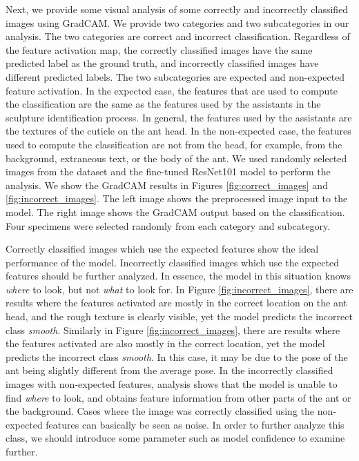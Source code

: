 \documentclass{aci}
\numberwithin{equation}{section}
\begin{document}

Next, we provide some visual analysis of some correctly and
incorrectly classified images using GradCAM. We provide two categories and two
subcategories in our analysis. The two categories are correct and incorrect
classification. Regardless of the feature activation map, the correctly
classified images have the same predicted label as the ground truth, and
incorrectly classified images have different predicted labels. The two
subcategories are expected and non-expected feature activation. In the expected
case, the features that are used to compute the classification are the same as
the features used by the assistants in the sculpture identification process. In
general, the features used by the assistants are the textures of the cuticle on
the ant head. In the non-expected case, the features used to compute the
classification are not from the head, for example, from the background,
extraneous text, or the body of the ant. We used randomly selected images from
the dataset and the fine-tuned ResNet101 model to perform the analysis. We show
the GradCAM results in Figures \ref{fig:correct_images} and
\ref{fig:incorrect_images}. The left image shows the preprocessed image input
to the model. The right image shows the GradCAM output based on the
classification. Four specimens were selected randomly from each category and
subcategory.

Correctly classified images which use the expected features show the ideal
performance of the model. Incorrectly classified images which use the expected
features should be further analyzed. In essence, the model in this situation
knows \textit{where} to look, but not \textit{what} to look for. In Figure
\ref{fig:incorrect_images}, there are results where the features activated are
mostly in the correct location on the ant head, and the rough texture is clearly
visible, yet the model predicts the incorrect class \textit{smooth}. Similarly
in Figure \ref{fig:incorrect_images}, there are results where the features
activated are also mostly in the correct location, yet the model predicts the
incorrect class \textit{smooth}. In this case, it may be due to the pose of the
ant being slightly different from the average pose. In the incorrectly
classified images with non-expected features, analysis shows that the model is
unable to find \textit{where} to look, and obtains feature information from
other parts of the ant or the background. Cases where the image was correctly
classified using the non-expected features can basically be seen as noise. In
order to further analyze this class, we should introduce some parameter such as
model confidence to examine further.
\end{document}
